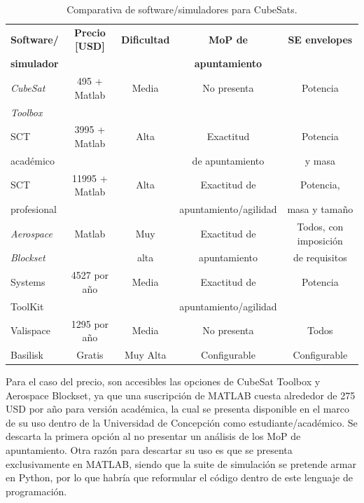 \begin{table}[ht]
	\centering
	\caption{Comparativa de software/simuladores para CubeSats.}
	\label{tab:sims}
	\begin{tabular}{|l|c|c|c|c|}
		\hline
		\textbf{Software/} & \textbf{Precio [USD]}  & \textbf{Dificultad} & \textbf{MoP de} & \textbf{SE envelopes} \\
		\textbf{simulador} &  &  & \textbf{apuntamiento} &  \\ \hline
		\textit{CubeSat}     & 495 + Matlab          & Media               & No presenta                & Potencia                \\ 
		\textit{Toolbox}     & & &  &            \\ \hline
		SCT                 & 3995 + Matlab         & Alta                & Exactitud   & Potencia          \\ 
		académico                & &  &  de apuntamiento & y masa          \\ \hline
		SCT               & 11995 + Matlab        & Alta                & Exactitud de & Potencia, \\
		profesional              &  &  &  apuntamiento/agilidad & masa y tamaño \\ \hline
		\textit{Aerospace}  & Matlab                & Muy             & Exactitud de   & Todos, con imposición \\
		\textit{Blockset}  &                 & alta            &  apuntamiento  & de requisitos \\ \hline
		Systems               & 4527 por año          & Media               & Exactitud de  & Potencia         \\ 
		ToolKit              & &                & apuntamiento/agilidad &          \\ \hline
		Valispace                    & 1295 por año          & Media               & No presenta                & Todos                  \\ \hline
		Basilisk & Gratis & Muy Alta & Configurable & Configurable \\ \hline
	\end{tabular}

\end{table}


Para el caso del precio, son accesibles las opciones de CubeSat Toolbox y Aerospace Blockset, ya que una suscripción de MATLAB cuesta alrededor de 275 USD por año para versión académica, la cual se presenta disponible en el marco de su uso dentro de la Universidad de Concepción como estudiante/académico. Se descarta la primera opción al no presentar un análisis de los MoP de apuntamiento. Otra razón para descartar su uso es que se presenta exclusivamente en MATLAB, siendo que la suite de simulación se pretende armar en Python, por lo que habría que reformular el código dentro de este lenguaje de programación. 

